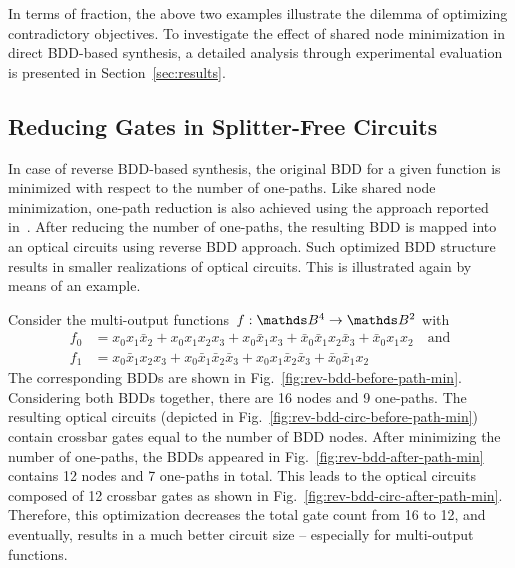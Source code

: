 \documentclass[10pt,letterpaper,twoside,openright]{book}
\begin{document}
In terms of fraction, the above two examples illustrate the dilemma of optimizing contradictory objectives. To investigate the effect of shared node minimization in direct BDD-based synthesis, a detailed analysis through experimental evaluation is presented in Section~\ref{sec:results}.

\subsection{Reducing Gates in Splitter-Free Circuits}

In case of reverse BDD-based synthesis, the original BDD for a given function is minimized with respect to the number of one-paths. Like shared node minimization, one-path reduction is also achieved using the approach reported in~\cite{ShirinzadehSD15}. %
After reducing the number of one-paths, the resulting BDD is mapped into an optical circuits using reverse BDD approach. Such optimized BDD structure results in smaller realizations of optical circuits. This is illustrated again by means of an example.  

\begin{example}
Consider the multi-output functions~$f:\B^4\rightarrow\B^2$ with 
\begin{align*}
f_0 &=x_0x_1\bar{x}_2+x_0x_1x_2x_3+x_0\bar{x}_1x_3+\bar{x}_0\bar{x}_1x_2\bar{x}_3+
\bar{x}_0x_1x_2 \quad\text{and}\\
f_1 &=x_0\bar{x}_1x_2x_3+x_0\bar{x}_1\bar{x}_2\bar{x}_3+x_0x_1\bar{x}_2\bar{x}_3+
\bar{x}_0\bar{x}_1x_2
\end{align*}
The corresponding BDDs are shown in Fig.~\ref{fig:rev-bdd-before-path-min}. Considering both BDDs together, there are 16 nodes and 9 one-paths. The resulting optical circuits (depicted in Fig.~\ref{fig:rev-bdd-circ-before-path-min}) contain crossbar gates equal to the number of BDD nodes. After minimizing the number of one-paths, the BDDs appeared in Fig.~\ref{fig:rev-bdd-after-path-min} contains 12 nodes and 7 one-paths in total. This leads to the optical circuits composed of 12 crossbar gates as shown in Fig.~\ref{fig:rev-bdd-circ-after-path-min}. Therefore, this optimization decreases the total gate count from 16 to 12, and eventually, results in a much better circuit size -- especially for multi-output functions. 
\end{example}
\end{document}

